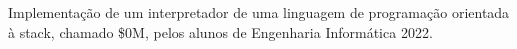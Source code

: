 Implementação de um interpretador de uma linguagem de programação orientada à stack, chamado \$0M, pelos alunos de Engenharia Informática 2022. 